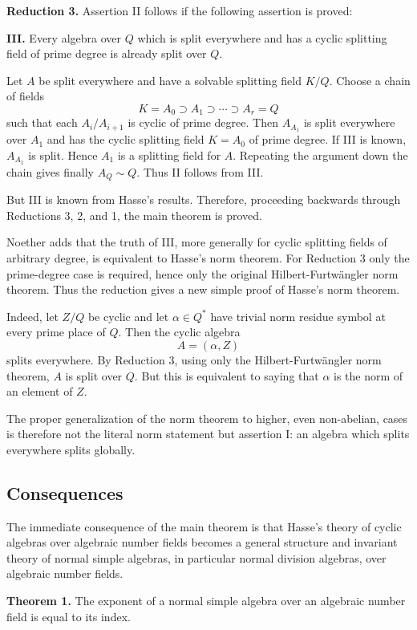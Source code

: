 \documentclass[11pt]{article}
\begin{document}
\textbf{Reduction 3.} Assertion II follows if the following assertion is
proved:

\textbf{III.} Every algebra over \(Q\) which is split everywhere and has
a cyclic splitting field of prime degree is already split over \(Q\).

Let \(A\) be split everywhere and have a solvable splitting field
\(K/Q\). Choose a chain of fields \[
  K=A_0\supset A_1\supset\cdots\supset A_r=Q
\] such that each \(A_i/A_{i+1}\) is cyclic of prime degree. Then
\(A_{A_1}\) is split everywhere over \(A_1\) and has the cyclic
splitting field \(K=A_0\) of prime degree. If III is known, \(A_{A_1}\)
is split. Hence \(A_1\) is a splitting field for \(A\). Repeating the
argument down the chain gives finally \(A_Q\sim Q\). Thus II follows
from III.

But III is known from Hasse's results. Therefore, proceeding backwards
through Reductions 3, 2, and 1, the main theorem is proved.

Noether adds that the truth of III, more generally for cyclic splitting
fields of arbitrary degree, is equivalent to Hasse's norm theorem. For
Reduction 3 only the prime-degree case is required, hence only the
original Hilbert-Furtwängler norm theorem. Thus the reduction gives a
new simple proof of Hasse's norm theorem.

Indeed, let \(Z/Q\) be cyclic and let \(\alpha\in Q^*\) have trivial
norm residue symbol at every prime place of \(Q\). Then the cyclic
algebra \[
  A=(\alpha,Z)
\] splits everywhere. By Reduction 3, using only the Hilbert-Furtwängler
norm theorem, \(A\) is split over \(Q\). But this is equivalent to
saying that \(\alpha\) is the norm of an element of \(Z\).

The proper generalization of the norm theorem to higher, even
non-abelian, cases is therefore not the literal norm statement but
assertion I: an algebra which splits everywhere splits globally.

\subsection{Consequences}\label{consequences}

The immediate consequence of the main theorem is that Hasse's theory of
cyclic algebras over algebraic number fields becomes a general structure
and invariant theory of normal simple algebras, in particular normal
division algebras, over algebraic number fields.

\textbf{Theorem 1.} The exponent of a normal simple algebra over an
algebraic number field is equal to its index.
\end{document}

